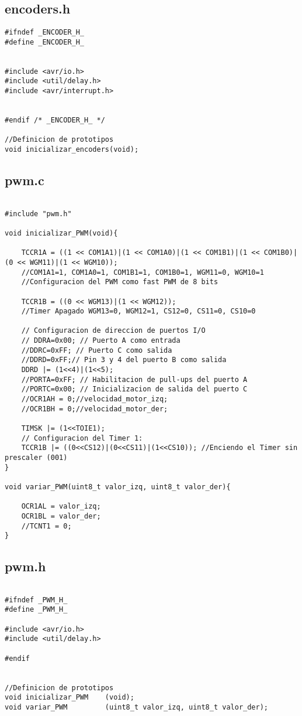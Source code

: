 \documentclass[a4paper,12pt]{article}   %
\begin{document}
\subsection{encoders.h}
\begin{lstlisting}
#ifndef _ENCODER_H_
#define _ENCODER_H_


#include <avr/io.h>
#include <util/delay.h>
#include <avr/interrupt.h>


#endif /* _ENCODER_H_ */

//Definicion de prototipos
void inicializar_encoders(void);
\end{lstlisting}

\subsection{pwm.c}
\begin{lstlisting}

#include "pwm.h"

void inicializar_PWM(void){

	TCCR1A = ((1 << COM1A1)|(1 << COM1A0)|(1 << COM1B1)|(1 << COM1B0)|(0 << WGM11)|(1 << WGM10));
	//COM1A1=1, COM1A0=1, COM1B1=1, COM1B0=1, WGM11=0, WGM10=1
	//Configuracion del PWM como fast PWM de 8 bits

	TCCR1B = ((0 << WGM13)|(1 << WGM12));
	//Timer Apagado WGM13=0, WGM12=1, CS12=0, CS11=0, CS10=0

	// Configuracion de direccion de puertos I/O
	// DDRA=0x00; // Puerto A como entrada
	//DDRC=0xFF; // Puerto C como salida
	//DDRD=0xFF;// Pin 3 y 4 del puerto B como salida
	DDRD |= (1<<4)|(1<<5);
	//PORTA=0xFF; // Habilitacion de pull-ups del puerto A
	//PORTC=0x00; // Inicializacion de salida del puerto C
	//OCR1AH = 0;//velocidad_motor_izq;
	//OCR1BH = 0;//velocidad_motor_der;

    TIMSK |= (1<<TOIE1);
	// Configuracion del Timer 1:
	TCCR1B |= ((0<<CS12)|(0<<CS11)|(1<<CS10)); //Enciendo el Timer sin prescaler (001)
}

void variar_PWM(uint8_t valor_izq, uint8_t valor_der){

	OCR1AL = valor_izq;
	OCR1BL = valor_der;
	//TCNT1 = 0;
}
\end{lstlisting}

\subsection{pwm.h}
\begin{lstlisting}

#ifndef _PWM_H_
#define _PWM_H_

#include <avr/io.h>
#include <util/delay.h>

#endif


//Definicion de prototipos
void inicializar_PWM    (void);
void variar_PWM         (uint8_t valor_izq, uint8_t valor_der);
\end{lstlisting}
\end{document}
